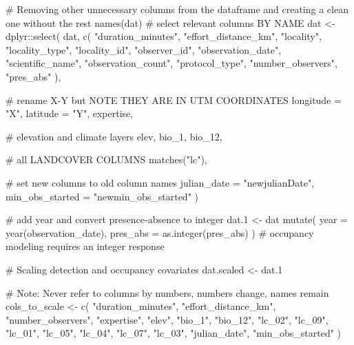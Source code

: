 \documentclass[
]{article}
\newenvironment{Shaded}{}{}
\newcommand{\AlertTok}[1]{\textcolor[rgb]{1.00,0.00,0.00}{#1}}
\newcommand{\CommentTok}[1]{\textcolor[rgb]{0.00,0.50,0.00}{#1}}
\newcommand{\DataTypeTok}[1]{#1}
\newcommand{\DecValTok}[1]{#1}
\newcommand{\FloatTok}[1]{#1}
\newcommand{\KeywordTok}[1]{\textcolor[rgb]{0.00,0.00,1.00}{#1}}
\newcommand{\NormalTok}[1]{#1}
\newcommand{\OperatorTok}[1]{#1}
\newcommand{\StringTok}[1]{\textcolor[rgb]{0.00,0.50,0.50}{#1}}
\begin{document}
\begin{Shaded}
\begin{Highlighting}[]
\CommentTok{# Removing other unnecessary columns from the dataframe and creating a clean one without the rest}
\KeywordTok{names}\NormalTok{(dat)}
\CommentTok{# select relevant columns BY NAME}
\NormalTok{dat <-}\StringTok{ }\NormalTok{dplyr}\OperatorTok{::}\KeywordTok{select}\NormalTok{(}
\NormalTok{  dat,}
  \KeywordTok{c}\NormalTok{(}
    \StringTok{"duration_minutes"}\NormalTok{, }\StringTok{"effort_distance_km"}\NormalTok{, }\StringTok{"locality"}\NormalTok{,}
    \StringTok{"locality_type"}\NormalTok{, }\StringTok{"locality_id"}\NormalTok{, }\StringTok{"observer_id"}\NormalTok{,}
    \StringTok{"observation_date"}\NormalTok{, }\StringTok{"scientific_name"}\NormalTok{, }\StringTok{"observation_count"}\NormalTok{,}
    \StringTok{"protocol_type"}\NormalTok{, }\StringTok{"number_observers"}\NormalTok{, }\StringTok{"pres_abs"}
\NormalTok{  ),}

  \CommentTok{# rename X-Y but }\AlertTok{NOTE}\CommentTok{ THEY ARE IN UTM COORDINATES}
  \DataTypeTok{longitude =} \StringTok{"X"}\NormalTok{, }\DataTypeTok{latitude =} \StringTok{"Y"}\NormalTok{,}
\NormalTok{  expertise,}

  \CommentTok{# elevation and climate layers}
\NormalTok{  elev, bio_}\DecValTok{1}\NormalTok{, bio_}\DecValTok{12}\NormalTok{,}

  \CommentTok{# all LANDCOVER COLUMNS}
  \KeywordTok{matches}\NormalTok{(}\StringTok{"lc"}\NormalTok{),}

  \CommentTok{# set new columns to old column names}
  \DataTypeTok{julian_date =} \StringTok{"newjulianDate"}\NormalTok{,}
  \DataTypeTok{min_obs_started =} \StringTok{"newmin_obs_started"}
\NormalTok{)}

\CommentTok{# add year and convert presence-absence to integer}
\NormalTok{dat}\FloatTok{.1}\NormalTok{ <-}\StringTok{ }\NormalTok{dat }\OperatorTok{%
\StringTok{  }\KeywordTok{mutate}\NormalTok{(}
    \DataTypeTok{year =} \KeywordTok{year}\NormalTok{(observation_date),}
    \DataTypeTok{pres_abs =} \KeywordTok{as.integer}\NormalTok{(pres_abs)}
\NormalTok{  ) }\CommentTok{# occupancy modeling requires an integer response}

\CommentTok{# Scaling detection and occupancy covariates}
\NormalTok{dat.scaled <-}\StringTok{ }\NormalTok{dat}\FloatTok{.1}

\CommentTok{# Note: Never refer to columns by numbers, numbers change, names remain}
\NormalTok{cols_to_scale <-}\StringTok{ }\KeywordTok{c}\NormalTok{(}
  \StringTok{"duration_minutes"}\NormalTok{, }\StringTok{"effort_distance_km"}\NormalTok{,}
  \StringTok{"number_observers"}\NormalTok{, }\StringTok{"expertise"}\NormalTok{, }\StringTok{"elev"}\NormalTok{, }\StringTok{"bio_1"}\NormalTok{, }\StringTok{"bio_12"}\NormalTok{, }\StringTok{"lc_02"}\NormalTok{, }\StringTok{"lc_09"}\NormalTok{, }\StringTok{"lc_01"}\NormalTok{, }\StringTok{"lc_05"}\NormalTok{, }\StringTok{"lc_04"}\NormalTok{, }\StringTok{"lc_07"}\NormalTok{, }\StringTok{"lc_03"}\NormalTok{, }\StringTok{"julian_date"}\NormalTok{, }\StringTok{"min_obs_started"}
\NormalTok{)}

}
\end{Highlighting}
\end{Shaded}
\end{document}
